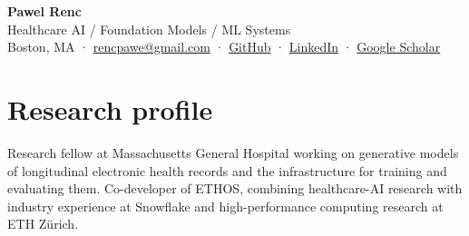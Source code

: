 \documentclass[10pt,letterpaper]{article}
\begin{document}
\raggedright
{\fontsize{29}{32}\selectfont\bfseries Pawel Renc}\\[4pt]
{\large\color{accent}Healthcare AI \enspace / \enspace Foundation Models \enspace / \enspace ML Systems}\\[6pt]
{\small Boston, MA \enspace · \enspace \href{mailto:rencpawe@gmail.com}{rencpawe@gmail.com}
\enspace · \enspace \href{https://github.com/prenc}{GitHub}
\enspace · \enspace \href{https://www.linkedin.com/in/pawel-renc}{LinkedIn}
\enspace · \enspace \href{https://scholar.google.com/citations?user=Ip7ldAEAAAAJ}{Google Scholar}}
\section{Research profile}
Research fellow at Massachusetts General Hospital working on generative models of longitudinal electronic health records and the infrastructure for training and evaluating them. Co-developer of ETHOS, combining healthcare-AI research with industry experience at Snowflake and high-performance computing research at ETH Zürich.
\end{document}
